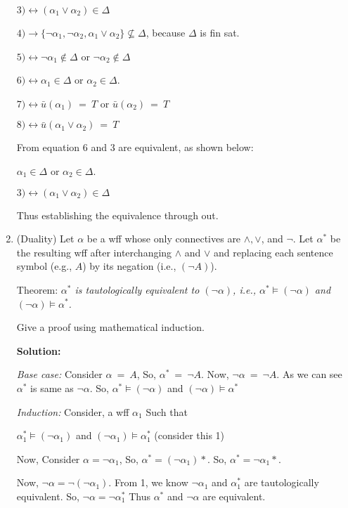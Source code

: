 \documentclass[12pt,letterpaper]{article}
\begin{document}
\begin{enumerate}
  $3) \leftrightarrow (\alpha_{1} \lor \alpha_{2}) \in \Delta$
  
  $4) \rightarrow \{\lnot \alpha_{1}, \lnot \alpha_{2}, \alpha_{1} \lor \alpha_{2}\} \not\subseteq \Delta$, because $\Delta$ is fin sat.
  
  $5) \leftrightarrow \lnot \alpha_{1} \not\in \Delta$ or $ \lnot \alpha_{2} \not\in \Delta$
  
  $6) \leftrightarrow \alpha_{1} \in \Delta$ or $ \alpha_{2} \in \Delta$.
   
 $7) \leftrightarrow \bar{u}(\alpha_{1})\ =\ T$ or $\bar{u}(\alpha_{2})\ =\ T$ 
 
 $8) \leftrightarrow \bar{u}(\alpha_{1} \lor \alpha_{2})\ =\ T$ 


From equation 6 and 3 are equivalent, as shown below:

$\alpha_{1} \in \Delta$ or $ \alpha_{2} \in \Delta$.


$3) \leftrightarrow (\alpha_{1} \lor \alpha_{2}) \in \Delta$


Thus establishing the equivalence through out.

\item 
  (Duality)
  Let $\alpha$ be a wff whose only connectives are $\land,\lor$,
  and $\neg$.
  Let $\alpha^*$ be the resulting wff after interchanging $\land$
  and $\lor$ and replacing each sentence symbol (e.g., $A$) by its
  negation (i.e., $(\neg A)$).
  
  {\sc Theorem:}
  {\em $\alpha^*$ is tautologically equivalent to $(\neg
    \alpha)$, i.e., $\alpha^*\models (\neg\alpha)$ and 
    $(\neg\alpha)\models\alpha^*$.}

  Give a proof using mathematical induction.
  
  \textbf{Solution:}
  
  \textit{Base case:} Consider $\alpha\ =\ A$, So, $\alpha^*\ =\ \lnot A$. Now, $\lnot \alpha\ =\ \lnot A$. As we can see $\alpha^*$ is same as $\lnot \alpha$. So, $\alpha^*\models (\neg\alpha)$ and $(\neg\alpha)\models\alpha^*$
  
  \textit{Induction:} Consider, a wff $\alpha_{1}$ Such that 
  
  $\alpha_{1}^*\models (\neg\alpha_{1})$ and $(\neg\alpha_{1})\models\alpha_{1}^*$  (consider this 1)
  
  Now, Consider $\alpha = \lnot \alpha_{1}$, So, $\alpha^{*} = (\lnot \alpha_{1})*$. So, $\alpha^{*} = \lnot \alpha_{1}*$. 
  
  Now, $\lnot \alpha = \lnot(\lnot \alpha_{1})$. From 1, we know $\lnot \alpha_{1}$ and $\alpha_{1}^{*}$ are tautologically equivalent. So, $\lnot \alpha = \lnot \alpha_{1}^{*}$
  Thus $\alpha^{*}$ and $\lnot \alpha$ are equivalent.


\end{enumerate}
\end{document}
